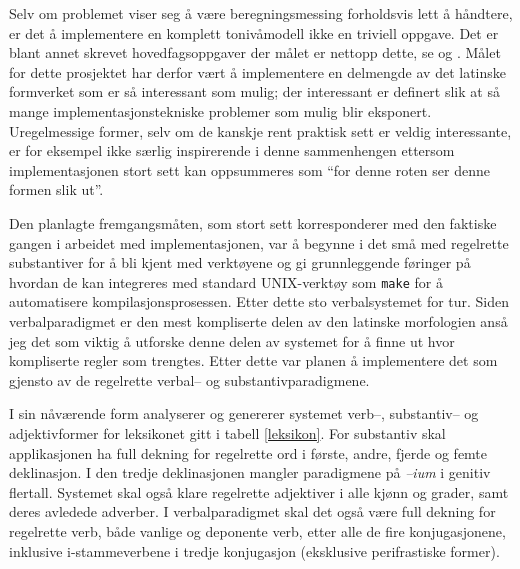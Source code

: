 \documentclass{article}
\let\prog\texttt
\let\w\emph
\begin{document}
Selv om problemet viser seg \aa{} v\ae{}re beregningsmessing forholdsvis lett
\aa{} h\aa{}ndtere, er det \aa{} implementere en komplett toniv\aa{}modell
ikke en triviell oppgave. Det er blant annet skrevet hovedfagsoppgaver der
m\aa{}let er nettopp dette, se  og . M\aa{}let
for dette prosjektet har derfor v\ae{}rt \aa{} implementere en delmengde av
det latinske formverket som er s\aa{} interessant som mulig; der interessant
er definert slik at s\aa{} mange implementasjonstekniske problemer som mulig
blir eksponert. Uregelmessige former, selv om de kanskje rent praktisk sett er
veldig interessante, er for eksempel ikke s\ae{}rlig inspirerende i denne
sammenhengen ettersom implementasjonen stort sett kan oppsummeres som ``for
denne roten ser denne formen slik ut''.

Den planlagte fremgangsm\aa{}ten, som stort sett korresponderer med den
faktiske gangen i arbeidet med implementasjonen, var \aa{} begynne i det
sm\aa{} med regelrette substantiver for \aa{} bli kjent med verkt\o{}yene og
gi grunnleggende f\o{}ringer p\aa{} hvordan de kan integreres med standard
UNIX-verkt\o{}y som \prog{make} for \aa{} automatisere kompilasjonsprosessen.
Etter dette sto verbalsystemet for tur. Siden verbalparadigmet er den mest
kompliserte delen av den latinske morfologien ans\aa{} jeg det som viktig
\aa{} utforske denne delen av systemet for \aa{} finne ut hvor kompliserte
regler som trengtes. Etter dette var planen \aa{} implementere det som gjensto
av de regelrette verbal-- og substantivparadigmene.

I sin n\aa{}v\ae{}rende form analyserer og genererer systemet verb--,
substantiv-- og adjektivformer for leksikonet gitt i tabell \ref{leksikon}.
For substantiv skal applikasjonen ha full dekning for regelrette ord i
f\o{}rste, andre, fjerde og femte deklinasjon. I den tredje deklinasjonen
mangler paradigmene p\aa{} \w{--ium} i genitiv flertall. Systemet skal
ogs\aa{} klare regelrette adjektiver i alle kj\o{}nn og grader, samt deres
avledede adverber. I verbalparadigmet skal det ogs\aa{} v\ae{}re full dekning
for regelrette verb, b\aa{}de vanlige og deponente verb, etter alle de fire
konjugasjonene, inklusive i-stammeverbene i tredje konjugasjon (eksklusive
perifrastiske former).
\end{document}
